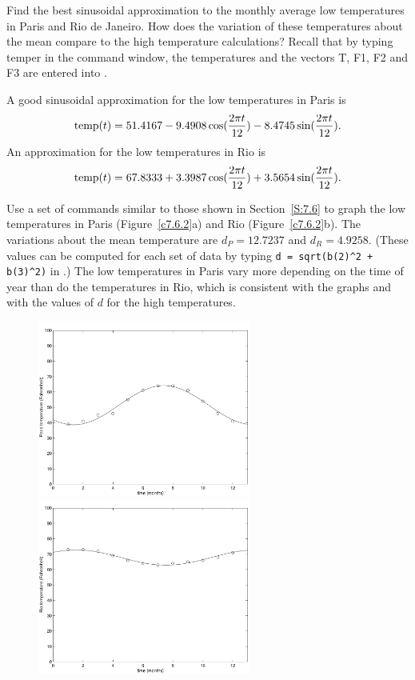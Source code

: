 \documentclass{ximera}
\begin{document}
\begin{computerExercise} \label{c7.6.2}
Find the best sinusoidal approximation to the monthly average low temperatures
in Paris and Rio de Janeiro.  How does the variation of these temperatures
about the mean compare to the high temperature calculations? 
Recall that by typing {\sf temper} in the \Matlab  command window, the temperatures 
and the vectors {\sf T}, {\sf F1}, {\sf F2} and {\sf F3} are entered into \Matlabp.

\begin{solution}

\ans A good sinusoidal approximation for the low temperatures in Paris
is 
\[ \hbox{temp}(t) = 51.4167 - 9.4908\cos(\frac{2\pi t}{12}) -
8.4745\sin(\frac{2\pi t}{12}). \]
An approximation for the low temperatures in Rio is
\[ \hbox{temp}(t) = 67.8333 + 3.3987\cos(\frac{2\pi t}{12}) +
3.5654\sin(\frac{2\pi t}{12}). \]

\soln Use a set of \Matlab commands similar to those shown in
Section~\ref{S:7.6} to graph the low temperatures in Paris
(Figure~\ref{c7.6.2}a) and Rio (Figure~\ref{c7.6.2}b).  The
variations about the mean temperature are $d_P = 12.7237$ and
$d_R = 4.9258$.  (These values can be computed for each set of data
by typing {\tt d = sqrt(b(2)\^{}2 + b(3)\^{}2)} in \Matlabp.) 
The low temperatures in Paris vary more depending on the time of
year than do the temperatures in Rio, which is consistent with
the graphs and with the values of $d$ for the high temperatures.

\begin{figure}[htb]
		\centerline{%
		\includegraphics[width=2.75in]{exfigure/7-6-2a.pdf}
		\includegraphics[width=2.75in]{exfigure/7-6-2b.pdf}}
\end{figure}

\end{solution}
\end{computerExercise}
\end{document}
